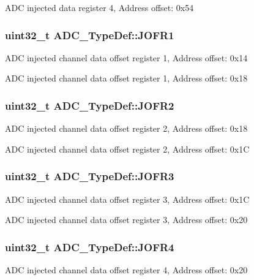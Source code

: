 A\-D\-C injected data register 4, Address offset\-: 0x54 \hypertarget{struct_a_d_c___type_def_aa005e656f528aaad28d70d61c9db9b81}{
\subsubsection[{J\-O\-F\-R1}]{ uint32\-\_\-t A\-D\-C\-\_\-\-Type\-Def\-::\-J\-O\-F\-R1}}\label{struct_a_d_c___type_def_aa005e656f528aaad28d70d61c9db9b81}
A\-D\-C injected channel data offset register 1, Address offset\-: 0x14

A\-D\-C injected channel data offset register 1, Address offset\-: 0x18 \hypertarget{struct_a_d_c___type_def_aa20f76044c11042dde41c1060853fb82}{
\subsubsection[{J\-O\-F\-R2}]{ uint32\-\_\-t A\-D\-C\-\_\-\-Type\-Def\-::\-J\-O\-F\-R2}}\label{struct_a_d_c___type_def_aa20f76044c11042dde41c1060853fb82}
A\-D\-C injected channel data offset register 2, Address offset\-: 0x18

A\-D\-C injected channel data offset register 2, Address offset\-: 0x1\-C \hypertarget{struct_a_d_c___type_def_ae9c78142f6edf8122384263878d09015}{
\subsubsection[{J\-O\-F\-R3}]{ uint32\-\_\-t A\-D\-C\-\_\-\-Type\-Def\-::\-J\-O\-F\-R3}}\label{struct_a_d_c___type_def_ae9c78142f6edf8122384263878d09015}
A\-D\-C injected channel data offset register 3, Address offset\-: 0x1\-C

A\-D\-C injected channel data offset register 3, Address offset\-: 0x20 \hypertarget{struct_a_d_c___type_def_a92f5c1a5aaa8b286317f923482e09d35}{
\subsubsection[{J\-O\-F\-R4}]{ uint32\-\_\-t A\-D\-C\-\_\-\-Type\-Def\-::\-J\-O\-F\-R4}}\label{struct_a_d_c___type_def_a92f5c1a5aaa8b286317f923482e09d35}
A\-D\-C injected channel data offset register 4, Address offset\-: 0x20

